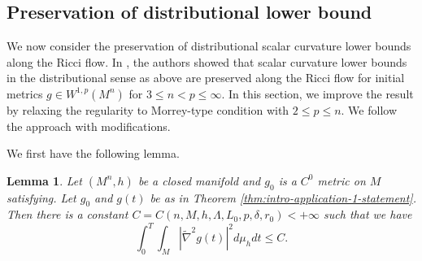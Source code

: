 \documentclass[12pt]{amsart}
\theoremstyle{plain}
\theoremstyle{plain}
\newtheorem{lemma}[subsection]{Lemma}
\theoremstyle{definition}
\theoremstyle{remark}
\numberwithin{equation}{subsection}
\newcommand{\hdel}{\tilde{\nabla}}
\begin{document}
\subsection{Preservation of distributional  lower bound}


We now consider the preservation of distributional scalar curvature lower bounds along the Ricci flow. In \cite{jiang_weak_2021}, the authors showed that scalar curvature lower bounds in the distributional sense as above are preserved along the Ricci flow for initial metrics $g \in W^{1,p}(M^n)$ for $3 \leq n < p \leq \infty$. In this section, we improve the result by relaxing the regularity to Morrey-type condition with $2 \leq p \leq n$. We follow the approach  \cite{jiang_weak_2021} with modifications.

We first have the following lemma.

\begin{lemma}\label{lem:hessiansquared-spacetime-integrability}
    Let $(M^n,h)$ be a closed manifold and $g_0$ is a $C^0$ metric on $M$ satisfying. Let $g_0$ and $g(t)$ be as in Theorem \ref{thm:intro-application-1-statement}. Then there is a constant $C = C(n, M,h, \Lambda, L_0, p, \delta,r_0) < +\infty$ such that we have
    \begin{equation*}
        \int_0^T \int_M |\hdel^2 g(t)|^2 d\mu_h dt \leq C.
    \end{equation*}
\end{lemma}
\end{document}
